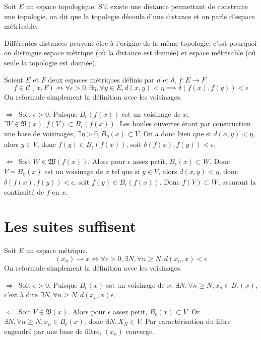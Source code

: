 \documentclass[a4paper, 11pt, french]{book}
\theoremstyle{plain} %
\theoremstyle{definition} %
\theoremstyle{remark} %
\newcommand\impldir{$\boxed{\Rightarrow}$\ }
\newcommand\implrec{$\boxed{\Leftarrow}$\ }
\newcommand{\1}{\mathds{1}}
\newcommand{\cont}{\mathcal{C}}
\newcommand{\supegal}{\geqslant}
\begin{document}
Soit $E$ un espace topologique.
S’il existe une distance permettant de construire une topologie, on dit que la topologie découle d’une distance et on parle d’espace métrisable.

\remarque
Différentes distances peuvent être à l’origine de la même topologie, c’est pourquoi on distingue espace métrique (où la distance est donnée) et espace métrisable (où seule la topologie est donnée).

\proposition
Soient $E$ et $F$ deux espaces métriques définis par $d$ et $\delta$, $f:E\rightarrow F$.
$$
f\in\cont(x, F)
\iff
\forall\epsilon>0, \exists\eta, \forall y\in E, d(x, y)<\eta\implies\delta(f(x), f(y))<\epsilon
$$
\demonstration On reformule simplement la définition avec les voisinages.

\impldir Soit $\epsilon>0$.
Puisque $B_\epsilon(f(x))$ est un voisinage de $x$, $\exists V\in\mathfrak{V}(x), f(V)\subset B_\epsilon(f(x))$.
Les boules ouvertes étant par construction une base de voisinages, $\exists\eta>0, B_\eta(x)\subset V$.
On a donc bien que si $d(x, y)<\eta$, alors $y\in V$, donc $f(y)\in B_\epsilon(f(x))$, soit $\delta(f(x), f(y))<\epsilon$.

\implrec Soit $W\in\mathfrak{W}(f(x))$.
Alors pour $\epsilon$ assez petit, $B_\epsilon(x)\subset W$.
Donc $V=B_\eta(x)$ est un voisinage de $x$ tel que si $y\in V$, alors $d(x, y)<\eta$, donc $\delta(f(x), f(y))<\epsilon$, soit $f(y)\in B_\epsilon(f(x))$.
Donc $f(V)\subset W$, assurant la continuité de $f$ en $x$.

\section{Les suites suffisent}

\proposition
Soit $E$ un espace métrique.
$$
(x_n)\rightarrow x
\iff
\forall\epsilon>0, \exists N, \forall n\supegal N, d(x_n, x)<\epsilon
$$
\demonstration On reformule simplement la définition avec les voisinages.

\impldir Soit $\epsilon>0$.
Puisque $B_\epsilon(x)$ est un voisinage de $x$, $\exists N, \forall n\supegal N, x_n\in B_\epsilon(x)$, c'est à dire $\exists N, \forall n\supegal N, d(x_n, x)\epsilon$.

\implrec Soit $V\in\mathfrak{V}(x)$.
Alors pour $\epsilon$ assez petit, $B_\epsilon(x)\subset V$.
Or $\exists N, \forall n\supegal N, x_n\in B_\epsilon(x)$, donc $\exists N, X_N\in V$.
Par caractérisation du filtre engendré par une base de filtre, $(x_n)$ converge.
\end{document}
